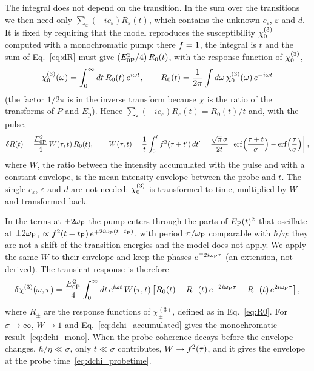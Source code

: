 \documentclass[10pt,a4paper]{paper}
\begin{document}
The integral does not depend on the transition. In the sum over the transitions we then need only
$\sum_\varepsilon(-ic_\varepsilon)R_\varepsilon(t)$, which contains the unknown $c_\varepsilon$, $\varepsilon$ and $d$.
It is fixed by requiring that the model reproduces the susceptibility $\chi^{(3)}_{0}$ computed with a monochromatic pump: there
$f = 1$, the integral is $t$ and the sum of Eq.~\eqref{eq:dR} must give $(E_{0\mathrm{P}}^2/4)\,R_0(t)$, with the response
function of $\chi^{(3)}_{0}$,
\begin{equation}
\chi^{(3)}_{0}(\omega) = \int_0^\infty dt\,R_0(t)\,e^{i\omega t} , \qquad
R_0(t) = \frac{1}{2\pi}\int d\omega\,\chi^{(3)}_{0}(\omega)\,e^{-i\omega t}
\label{eq:R0}
\end{equation}
(the factor $1/2\pi$ is in the inverse transform because $\chi$ is the ratio of the transforms of $P$ and
$E_{\mathrm{p}}$). Hence $\sum_\varepsilon(-ic_\varepsilon)R_\varepsilon(t) = R_0(t)/t$ and, with the pulse,
\begin{equation}
\delta R(t) = \frac{E_{0\mathrm{P}}^2}{4}\,W(\tau,t)\,R_0(t) , \qquad
W(\tau,t) = \frac{1}{t}\int_0^tf^2(\tau+t')\,dt'
= \frac{\sqrt{\pi}\,\sigma}{2t}\left[\mathrm{erf}\Big(\frac{\tau+t}{\sigma}\Big)
-\mathrm{erf}\Big(\frac{\tau}{\sigma}\Big)\right] ,
\label{eq:W}
\end{equation}
where $W$, the ratio between the intensity accumulated with the pulse and with a constant envelope, is the mean
intensity envelope between the probe and $t$. The single $c_\varepsilon$, $\varepsilon$ and $d$ are not needed: $\chi^{(3)}_{0}$
is transformed to time, multiplied by $W$ and transformed back.

In the terms at $\pm2\omega_{\mathrm{P}}$ the pump enters through the parts of $E_{\mathrm{P}}(t)^2$ that oscillate at $\pm2\omega_{\mathrm{P}}$,
$\propto f^2(t-t_{\mathrm{P}})\,e^{\mp2i\omega_{\mathrm{P}}(t-t_{\mathrm{P}})}$, with period $\pi/\omega_{\mathrm{P}}$ comparable with $\hbar/\eta$: they are not a shift
of the transition energies and the model does not apply. We apply the same $W$ to their envelope and keep the phases
$e^{\mp2i\omega_{\mathrm{P}}\tau}$ (an extension, not derived). The transient response is therefore
\begin{equation}
\delta\chi^{(3)}(\omega,\tau) = \frac{E_{0\mathrm{P}}^2}{4}\int_0^\infty dt\,e^{i\omega t}\,W(\tau,t)
\left[R_0(t) - R_+(t)\,e^{-2i\omega_{\mathrm{P}}\tau} - R_-(t)\,e^{2i\omega_{\mathrm{P}}\tau}\right] ,
\label{eq:dchi_accumulated}
\end{equation}
where $R_\pm$ are the response functions of $\chi^{(3)}_\pm$, defined as in Eq.~\eqref{eq:R0}. For $\sigma\to\infty$, $W\to1$ and
Eq.~\eqref{eq:dchi_accumulated} gives the monochromatic result~\eqref{eq:dchi_mono}. When the probe coherence decays
before the envelope changes, $\hbar/\eta\ll\sigma$, only $t\ll\sigma$ contributes, $W\to f^2(\tau)$, and it gives the
envelope at the probe time~\eqref{eq:dchi_probetime}.
\end{document}
